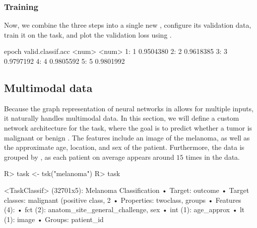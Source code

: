 \documentclass[article]{jss}
\theoremstyle{definition}
\begin{document}
\subsubsection{Training}

Now, we combine the three steps into a single new , configure its validation data, train it on the task, and plot the validation loss using  \citep{ref-ggplot2}.

\begin{CodeOutput}
   epoch valid.classif.acc
   <num>             <num>
1:     1         0.9504380
2:     2         0.9618385
3:     3         0.9797192
4:     4         0.9805592
5:     5         0.9801992
\end{CodeOutput}

\subsection{Multimodal data}\label{sec:multimodal}

Because the graph representation of neural networks in  allows for multiple inputs, it naturally handles multimodal data.
In this section, we will define a custom network architecture for the  task, where the goal is to predict whether a tumor is malignant or benign \citep{ref-international2020siim}.
The features include an image of the melanoma, as well as the approximate age, location, and sex of the patient.
Furthermore, the data is grouped by , as each patient on average appears around $15$ times in the data.

\begin{CodeInput}
R> task <- tsk("melanoma")
R> task
\end{CodeInput}
\begin{CodeOutput}
<TaskClassif> (32701x5): Melanoma Classification
• Target: outcome
• Target classes: malignant (positive class, 2%
• Properties: twoclass, groups
• Features (4):
  • fct (2): anatom_site_general_challenge, sex
  • int (1): age_approx
  • lt (1): image
• Groups: patient_id
\end{CodeOutput}
\end{document}
